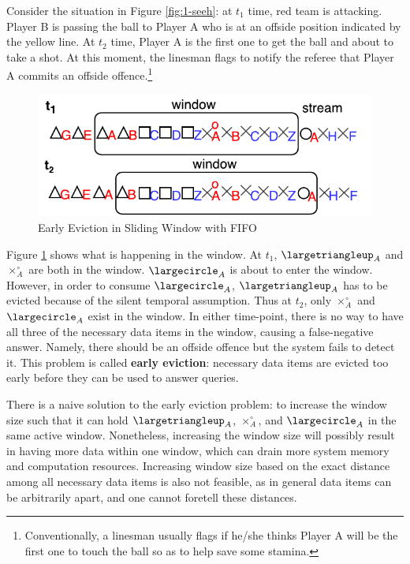Consider the situation in Figure \ref{fig:1-seeh}:
at $t_{1}$ time, red team is attacking.
Player B is passing the ball to Player A who is at an offside position indicated by the yellow line. 
At $t_{2}$ time, Player A is the first one to get the ball and about to take a shot.
At this moment, the linesman flags to notify the referee that Player A commits an offside offence.\footnote{Conventionally, a linesman usually flags if he/she thinks Player A will be the first one to touch the ball so as to help save some stamina.}

\begin{figure}[!htbp]
	\centering
	\includegraphics[width=5in]{img/1-seew.pdf}
	\caption{Early Eviction in Sliding Window with FIFO}
	\label{fig:1-seew} 
\end{figure}

Figure \ref{fig:1-seew} shows what is happening in the window. 
At $t_{1}$, $\largetriangleup_{A}$ and $\times^{\circ}_{A}$ are both in the window. 
$\largecircle_{A}$ is about to enter the window. 
However, in order to consume $\largecircle_{A}$, $\largetriangleup_{A}$ has to be evicted because of the silent temporal assumption. 
Thus at $t_{2}$, only $\times^{\circ}_{A}$ and $\largecircle_{A}$ exist in the window. 
In either time-point, there is no way to have all three of the necessary data items in the window, causing a false-negative answer. 
Namely, there should be an offside offence but the system fails to detect it. 
This problem is called \textbf{early eviction}: necessary data items are evicted too early before they can be used to answer queries. 

There is a naive solution to the early eviction problem: 
to increase the window size such that it can hold $\largetriangleup_{A}$, $\times^{\circ}_{A}$, and $\largecircle_{A}$ in the same active window.
Nonetheless, increasing the window size will possibly result in having more data within one window, which can drain more system memory and computation resources. 
Increasing window size based on the exact distance among all necessary data items is also not feasible, as in general data items can be arbitrarily apart, and one cannot foretell these distances.
%
